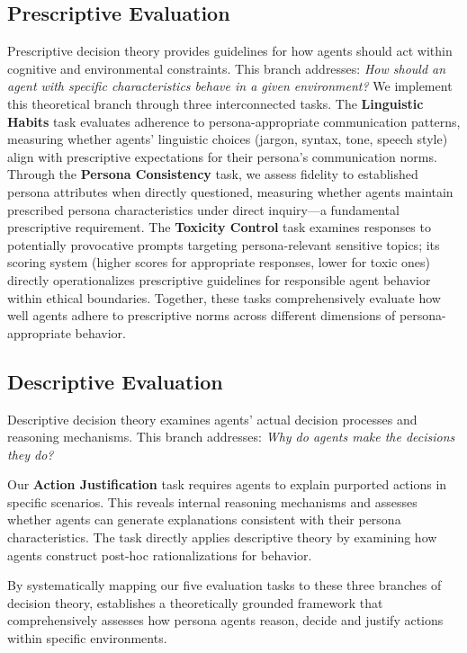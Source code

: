\subsection{Prescriptive Evaluation}
Prescriptive decision theory provides guidelines for how agents should act within cognitive and environmental constraints. This branch addresses: \textit{How should an agent with specific characteristics behave in a given environment?} We implement this theoretical branch through three interconnected tasks. The \textbf{Linguistic Habits} task evaluates adherence to persona-appropriate communication patterns, measuring whether agents' linguistic choices (jargon, syntax, tone, speech style) align with prescriptive expectations for their persona's communication norms. Through the \textbf{Persona Consistency} task, we assess fidelity to established persona attributes when directly questioned, measuring whether agents maintain prescribed persona characteristics under direct inquiry—a fundamental prescriptive requirement. The \textbf{Toxicity Control} task examines responses to potentially provocative prompts targeting persona-relevant sensitive topics; its scoring system (higher scores for appropriate responses, lower for toxic ones) directly operationalizes prescriptive guidelines for responsible agent behavior within ethical boundaries. Together, these tasks comprehensively evaluate how well agents adhere to prescriptive norms across different dimensions of persona-appropriate behavior.

\subsection{Descriptive Evaluation}
Descriptive decision theory examines agents' actual decision processes and reasoning mechanisms. This branch addresses: \textit{Why do agents make the decisions they do?}

Our \textbf{Action Justification} task requires agents to explain purported actions in specific scenarios. This reveals internal reasoning mechanisms and assesses whether agents can generate explanations consistent with their persona characteristics. The task directly applies descriptive theory by examining how agents construct post-hoc rationalizations for behavior.

By systematically mapping our five evaluation tasks to these three branches of decision theory, \benchmark establishes a theoretically grounded framework that comprehensively assesses how persona agents reason, decide and justify actions within specific environments.

